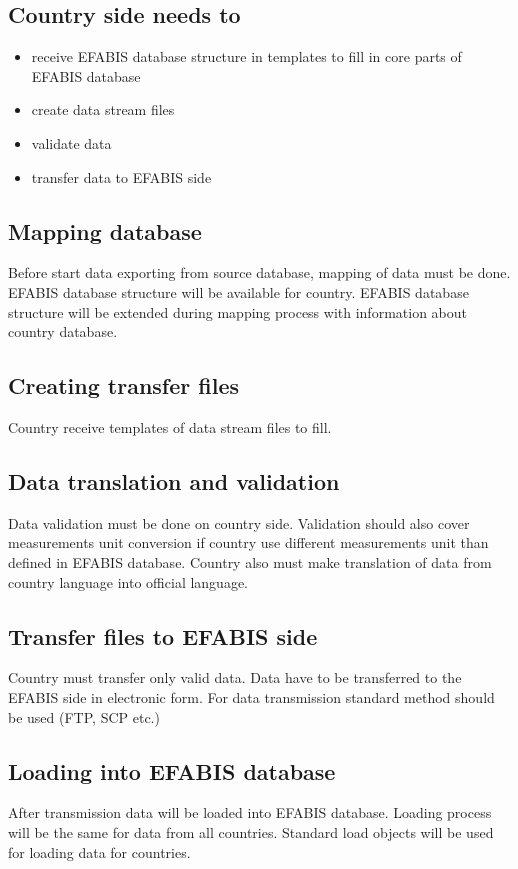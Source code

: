 \subsection{Country side needs to}
\begin{itemize}
\item receive EFABIS database structure in templates to fill in core parts of EFABIS database
\item create data stream files
\item validate data
\item transfer data to EFABIS side
\end{itemize}

\subsection{Mapping database}
Before start data exporting from source database, mapping of data must be done.
EFABIS database structure will be available for country. EFABIS database structure will be extended during mapping process with information about country database.

\subsection{Creating transfer files}
Country receive templates of data stream files to fill. 

\subsection{Data translation and validation}
Data validation must be done on country side. Validation should also cover measurements unit conversion if country use different measurements unit than defined in EFABIS database. Country also must make translation of data from country language into official language.

\subsection{Transfer files to EFABIS side}
Country must transfer only valid data. Data have to be transferred to the EFABIS side in electronic form.
For data transmission standard method should be used (FTP, SCP etc.)

\subsection{Loading into EFABIS database}
After transmission data will be loaded into EFABIS database. Loading process will be the same for data from all countries. Standard load objects will be used for loading data for countries.

